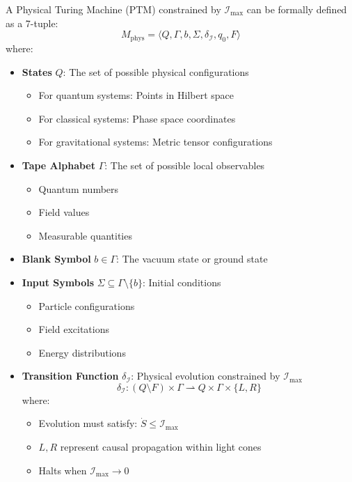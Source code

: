 \documentclass[12pt]{article}
\begin{document}
A Physical Turing Machine (PTM) constrained by \(\mathcal{I}_{\text{max}}\) can be formally defined as a 7-tuple:
\[
M_{\text{phys}} = \langle Q, \Gamma, b, \Sigma, \delta_{\mathcal{I}}, q_0, F \rangle
\]
where:

\begin{itemize}
    \item \textbf{States} \(Q\): The set of possible physical configurations
    \begin{itemize}
        \item For quantum systems: Points in Hilbert space
        \item For classical systems: Phase space coordinates
        \item For gravitational systems: Metric tensor configurations
    \end{itemize}

    \item \textbf{Tape Alphabet} \(\Gamma\): The set of possible local observables
    \begin{itemize}
        \item Quantum numbers
        \item Field values
        \item Measurable quantities
    \end{itemize}

    \item \textbf{Blank Symbol} \(b \in \Gamma\): The vacuum state or ground state

    \item \textbf{Input Symbols} \(\Sigma \subseteq \Gamma \setminus \{b\}\): Initial conditions
    \begin{itemize}
        \item Particle configurations
        \item Field excitations
        \item Energy distributions
    \end{itemize}

    \item \textbf{Transition Function} \(\delta_{\mathcal{I}}\): Physical evolution constrained by \(\mathcal{I}_{\text{max}}\)
    \[
    \delta_{\mathcal{I}}: (Q \setminus F) \times \Gamma \rightharpoonup Q \times \Gamma \times \{L,R\}
    \]
    where:
    \begin{itemize}
        \item Evolution must satisfy: \(\dot{S} \leq \mathcal{I}_{\text{max}}\)
        \item \(L,R\) represent causal propagation within light cones
        \item Halts when \(\mathcal{I}_{\text{max}} \to 0\)
    \end{itemize}


\end{itemize}
\end{document}
